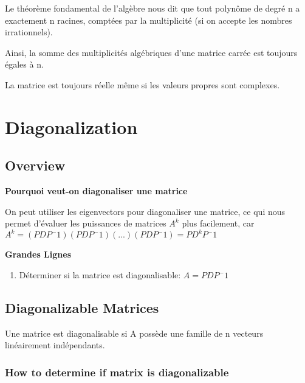 \documentclass{article}
\begin{document}
Le théorème fondamental de l'algèbre nous dit que tout polynôme de degré
n a exactement n racines, comptées par la multiplicité (si on accepte les
nombres irrationnels).

Ainsi, la somme des multiplicités algébriques d'une matrice carrée est
toujours égales à n.

\begin{remark}
    La matrice est toujours réelle même si les valeurs propres sont complexes.
\end{remark}

\section{Diagonalization}%
\label{sec:Diagonalization}

\subsection{Overview}%
\label{sub:Overview}

\textbf{Pourquoi veut-on diagonaliser une matrice}

On peut utiliser les eigenvectors pour diagonaliser une matrice, ce qui
nous permet d'évaluer les puissances de matrices $A^k$ plus facilement, car
$ A^k = (PDP^-1)(PDP^-1)(...)(PDP^-1) = PD^k P^-1 $

\textbf{Grandes Lignes}

\begin{enumerate}
    \item Déterminer si la matrice est diagonalisable: $ A = PDP^-1 $
\end{enumerate}

\subsection{Diagonalizable Matrices}%
\label{sub:Diagonalizable Matrices}

\begin{definition}
    Une matrice est diagonalisable si A possède une famille de n vecteurs
    linéairement indépendants.
\end{definition}

\subsubsection{How to determine if matrix is diagonalizable}%
\label{ssub:How to determine if matrix is diagonalizable}
\end{document}
